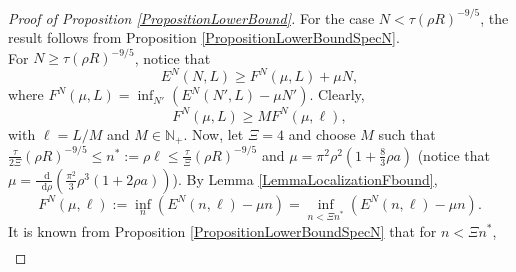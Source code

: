 \documentclass[a4paper,11pt]{article}
\newcommand*\diff{\mathop{}\!\mathrm{d}}
\numberwithin{equation}{section}
\begin{document}
		\begin{proof}[Proof of Proposition \ref{PropositionLowerBound}]
			For the case $ N<\tau (\rho R)^{-9/5} $, the result follows from Proposition \ref{PropositionLowerBoundSpecN}.\\
			For $ N\geq \tau (\rho R)^{-9/5} $, notice that \begin{equation}
			E^N(N,L)\geq F^N(\mu,L)+\mu N,
			\end{equation}
			where $ F^N(\mu,L)=\inf_{N'}\left(E^N(N',L)-\mu N'\right) $. Clearly, \begin{equation}
			F^N(\mu,L)\geq M F^N(\mu,\ell)\label{EqLocalizationF},
			\end{equation}
			with $ \ell=L/M $ and $ M\in \mathbb{N}_+ $. 
			Now, let $\Xi= 4 $ and choose $ M $ such that $ \frac{\tau}{2\Xi}\left(\rho R\right)^{-9/5}\leq n^*:=\rho\ell\leq \frac{\tau}{\Xi}\left(\rho R\right)^{-9/5} $ and $ \mu=\pi^2\rho^2\left(1+\frac{8}{3}\rho a\right) $ (notice that $ \mu=\frac{\diff}{\diff \rho}(\frac{\pi^2}{3}\rho^3(1+2\rho a))$). By Lemma \ref{LemmaLocalizationFbound},  \begin{equation}
			F^N(\mu,\ell):=\inf_{n}\left(E^N(n,\ell)-\mu n\right)=\inf_{n<\Xi n^*}\left(E^N(n,\ell)-\mu n\right).
			\end{equation}
			It is known from Proposition \ref{PropositionLowerBoundSpecN} that for $ n<\Xi n^* $,  \begin{equation}
			\begin{aligned}

\end{aligned}
\end{equation}
\end{proof}
\end{document}
